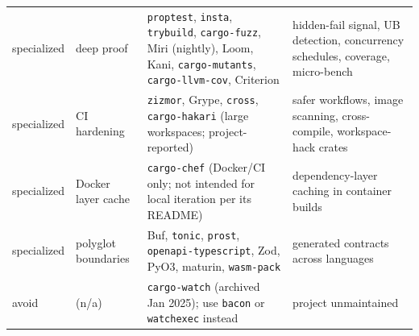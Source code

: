 \documentclass[conference]{IEEEtran}
\begin{document}
\begin{table}[t]
{\begin{tabular}{>{\raggedright\arraybackslash}p{}>{\raggedright\arraybackslash}p{}>{\raggedright\arraybackslash}p{}>{\raggedright\arraybackslash}p{}}
    \midrule
    specialized & deep proof & \texttt{proptest}, \texttt{insta}, \texttt{trybuild}, \texttt{cargo-fuzz}, Miri (nightly), Loom, Kani, \texttt{cargo-mutants}, \texttt{cargo-llvm-cov}, Criterion & hidden-fail signal, UB detection, concurrency schedules, coverage, micro-bench \\
    \rowcolor{tableStripe}
    specialized & CI hardening & \texttt{zizmor}, Grype, \texttt{cross}, \texttt{cargo-hakari} (large workspaces; project-reported) & safer workflows, image scanning, cross-compile, workspace-hack crates \\
    specialized & Docker layer cache & \texttt{cargo-chef} (Docker/CI only; not intended for local iteration per its README) \cite{cargoChef2026} & dependency-layer caching in container builds \\
    \rowcolor{tableStripe}
    specialized & polyglot boundaries & Buf, \texttt{tonic}, \texttt{prost}, \texttt{openapi-typescript}, Zod, PyO3, maturin, \texttt{wasm-pack} & generated contracts across languages \\
    \midrule
    avoid & (n/a) & \texttt{cargo-watch} (archived Jan 2025); use \texttt{bacon} or \texttt{watchexec} instead & project unmaintained \\
    \bottomrule
  \end{tabular}}
\end{table}
\end{document}
